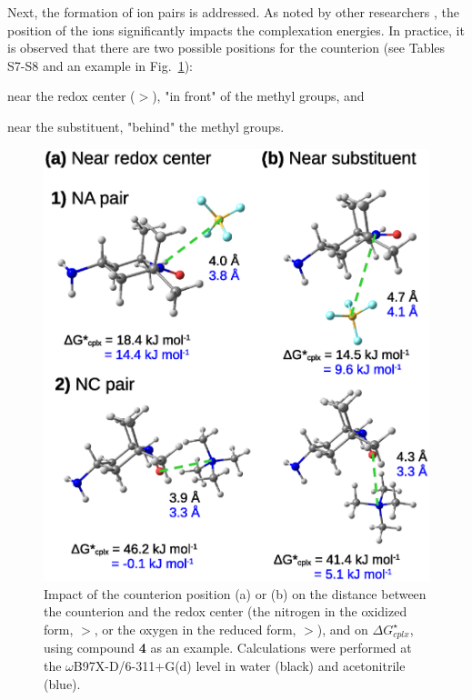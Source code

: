 \documentclass[review,preprint]{elsarticle}
\begin{document}
\clearpage

Next, the formation of ion pairs is addressed. As noted by other researchers \cite{zhangInteractionsImidazoliumBasedIonic2016,wylieImprovedPerformanceAllOrganic2019a}, the position of the ions significantly impacts the complexation energies. In practice, it is observed that there are two possible positions for the counterion (see Tables S7-S8 and an example in Fig.~\ref{fig:pos-anion}):
\begin{inparaenum}[(i)]
	\item near the redox center ($>$), "in front" of the methyl groups, and
	\item near the substituent, "behind" the methyl groups.
\end{inparaenum}

\begin{figure}[!h]
\centering
\includegraphics[width=.8\linewidth]{Figure12}
\caption{Impact of the counterion position (a) or (b) on the distance between the counterion and the redox center (the nitrogen in the oxidized form, $>$, or the oxygen in the reduced form, $>$), and on $\Delta G^\star_{cplx}$, using compound \textbf{4} as an example. Calculations were performed at the $\omega$B97X-D/6-311+G(d) level in water (black) and acetonitrile (blue).}
\label{fig:pos-anion}
\end{figure}
\end{document}
